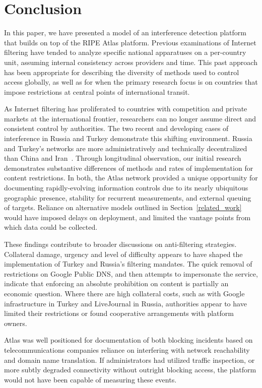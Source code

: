 \section{Conclusion}
\label{sec:conclusion}

In this paper, we have presented a model of an interference detection
platform that builds on top of the RIPE Atlas platform. Previous
examinations of Internet filtering have tended to analyze specific
national apparatuses on a per-country unit, assuming internal
consistency across providers and time. This past approach has been
appropriate for describing the diversity of methods used to control
access globally, as well as for when the primary research focus is on
countries that impose restrictions at central points of international
transit. 

As Internet filtering has proliferated to countries with competition and
private markets at the international frontier, researchers can no longer
assume direct and consistent control by authorities. The two recent and
developing cases of interference in Russia and Turkey demonstrate this
shifting environment. Russia and Turkey's networks are more
administratively and technically decentralized than China and
Iran~\cite{Roberts2011}. Through longitudinal observation, our initial
research demonstrates substantive differences of methods and rates of
implementation for content restrictions. In both, the Atlas network
provided a unique opportunity for documenting rapidly-evolving
information controls due to its nearly ubiquitous geographic presence,
stability for recurrent measurements, and external queuing of targets.
Reliance on alternative models outlined in Section~\ref{related_work}
would have imposed delays on deployment, and limited the vantage points
from which data could be collected. 

These findings contribute to broader discussions on anti-filtering
strategies.  Collateral damage, urgency and level of difficulty appears
to have shaped the implementation of Turkey and Russia's filtering
mandates. The quick removal of restrictions on Google Public DNS, and
then attempts to impersonate the service, indicate that enforcing an
absolute prohibition on content is partially an economic question. Where
there are high collateral costs, such as with Google infrastructure in
Turkey and LiveJournal in Russia, authorities appear to have limited
their restrictions or found cooperative arrangements with platform
owners. 

Atlas was well positioned for documentation of both blocking incidents
based on telecommunications companies reliance on interfering with
network reachability and domain name translation. If administrators had
utilized traffic inspection, or more subtly degraded connectivity
without outright blocking access, the platform would not have been
capable of measuring these events.

